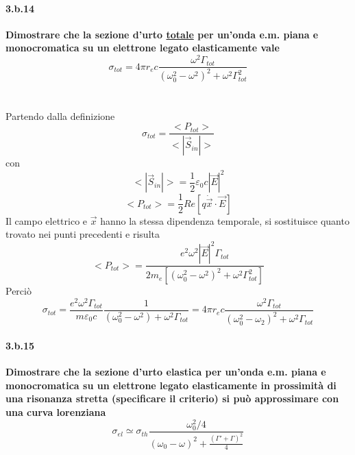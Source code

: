 \documentclass[twoside]{article}
\begin{document}
\paragraph{3.b.14}\textbf{Dimostrare che la sezione d’urto \underline{totale} per un’onda e.m. piana e monocromatica
su un elettrone legato elasticamente vale \begin{equation*}
    \sigma_{tot}=4\pi r_e c \frac{\omega^2 \Gamma_{tot}}{(\omega_0^2-\omega^2)^2+\omega^2\Gamma^2_{tot}}
\end{equation*}}\\ \\
Partendo dalla definizione
\begin{equation}
    \sigma_{tot}=\frac{<P_{tot}>}{<|\vec{S}_{in}|>}
\end{equation}
con
\begin{equation}
    <|\vec{S}_{in}|>=\frac{1}{2}\varepsilon_0 c |\vec{E}|^2
\end{equation}
\begin{equation}
    <P_{tot}>=\frac{1}{2}Re[q\dot{\vec{x}}\cdot \vec{E}]
\end{equation}
Il campo elettrico e $\vec{x}$ hanno la stessa dipendenza temporale, si sostituisce quanto trovato nei punti precedenti e risulta 
\begin{equation}
    <P_{tot}>=\frac{e^2\omega^2|\vec{E}|^2\Gamma_{tot}}{2m_e[(\omega_0^2-\omega^2)^2+\omega^2 \Gamma_{tot}^2]}
\end{equation}
Perciò
\begin{equation}
    \sigma_{tot}=\frac{e^2\omega^2\Gamma_{tot}}{m\varepsilon_0 c}\frac{1}{(\omega_0^2-\omega^2)+\omega^2\Gamma_{tot}}=4\pi r_e c \frac{\omega^2 \Gamma_{tot}}{(\omega_0^2-\omega_2)^2+\omega^2\Gamma_{tot}}
\end{equation}








\paragraph{3.b.15}\textbf{Dimostrare che la sezione d’urto elastica per un’onda e.m. piana e
monocromatica su un elettrone legato elasticamente in prossimità di una
risonanza stretta (specificare il criterio) si può approssimare con una curva
lorenziana \begin{equation*}
    \sigma_{el}\simeq \sigma_{th}\frac{\omega_0^2/4}{(\omega_0-\omega)^2+\frac{(\Gamma' +\Gamma)^2}{4}}
\end{equation*}}\\ \\
\end{document}
